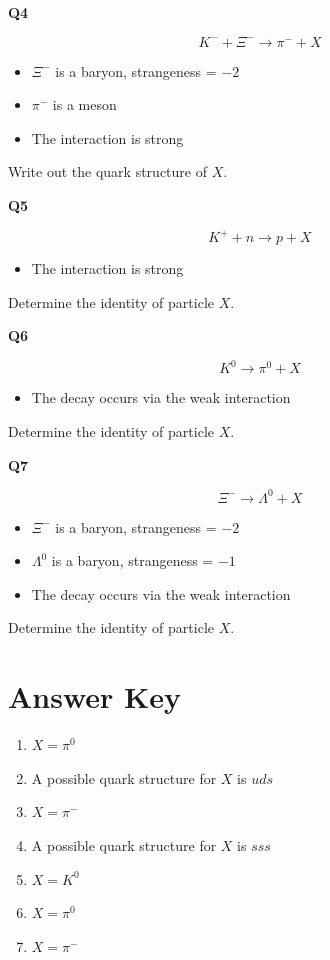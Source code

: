 \documentclass[12pt]{article}
\begin{document}
\newpage
\textbf{Q4}

\[
K^- + \Xi^- \rightarrow \pi^- + X
\]

\begin{itemize}
    \item $\Xi^-$ is a baryon, strangeness = $-2$
    \item $\pi^-$ is a meson
    \item The interaction is strong
\end{itemize}

Write out the quark structure of $X$.

\vspace{3em}

\textbf{Q5}

\[
K^+ + n \rightarrow p + X
\]

\begin{itemize}
    \item The interaction is strong
\end{itemize}

Determine the identity of particle $X$.

\vspace{3em}

\textbf{Q6}

\[
K^0 \rightarrow \pi^0 + X
\]

\begin{itemize}
    \item The decay occurs via the weak interaction
\end{itemize}

Determine the identity of particle $X$.

\vspace{3em}

\textbf{Q7}

\[
\Xi^- \rightarrow \Lambda^0 + X
\]

\begin{itemize}
    \item $\Xi^-$ is a baryon, strangeness = $-2$
    \item $\Lambda^0$ is a baryon, strangeness = $-1$
    \item The decay occurs via the weak interaction
\end{itemize}

Determine the identity of particle $X$.
\newpage
\section*{Answer Key}

\begin{enumerate}
    \item $X = \pi^{0}$
    \item A possible quark structure for $X$ is $uds$
    \item $X = \pi^{-}$
    \item A possible quark structure for $X$ is $sss$
    \item $X = K^{0}$
    \item $X = \pi^{0}$
    \item $X = \pi^{-}$
\end{enumerate}
\end{document}

